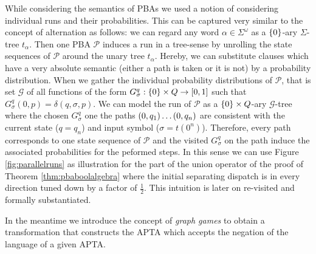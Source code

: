 While considering the semantics of \acp{PBA} we used a notion of considering 
individual runs and their probabilities. This can be captured very similar to 
the concept of alternation as follows: we can regard any word 
$\alpha\in\Sigma^{\omega}$ as a $\left\{0\right\}$-ary $\Sigma$-tree $t_{\alpha}$. Then 
one \ac{PBA} $\mathcal{P}$ induces a run in a tree-sense by unrolling the state
sequences of $\mathcal{P}$ around the unary tree $t_{\alpha}$. Hereby, we can
substitute clauses which have a very absolute semantic (either a
path is taken or it is not) by a probability distribution. When we gather the
individual probability distributions of $\mathcal{P}$, that is set 
$\mathcal{G}$ of all functions of the form 
$G_{\sigma}^{q}:\left\{0\right\}\times Q\rightarrow\left[0,1\right]$ such that
$G_{\sigma}^{q}(0, p) = \delta(q,\sigma, p)$. We can model the run of 
$\mathcal{P}$ as a $\left\{0\right\}\times Q$-ary $\mathcal{G}$-tree where the chosen
$G_{\sigma}^{q}$ one the paths $\left(0,q_{1}\right)\dots\left(0,q_{n}\right)$ are 
consistent with the current state ($q = q_{n}$) and input symbol 
($\sigma = t(0^n)$). Therefore, every path corresponds to one state sequence of 
$\mathcal{P}$ and the visited $G_{\sigma}^{q}$ on the path induce the 
associated probabilities for the peformed steps. In this sense we can use 
Figure \ref{fig:parallelruns} as illustration for the part of the union 
operator of the proof of Theorem \ref{thm:pbaboolalgebra} where the initial 
separating dispatch is in every direction tuned down by a factor of 
$\frac{1}{2}$. This intuition is later on re-visited and formally 
substantiated. 

In the meantime we introduce the concept of \emph{graph games} 
to obtain a transformation that constructs the \ac{APTA} which accepts the 
negation of the language of a given \ac{APTA}.

